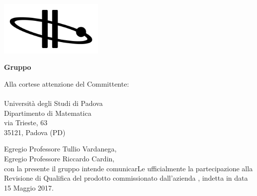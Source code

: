   
\begin{titlepage}
	
	\begin{center}
	 	
	\includegraphics[width=5cm]{../../modello/or-bit_bkg_minBorder.png} 
	\begin{Huge} 
	 	\textbf{Gruppo \GroupName{}}
	\end{Huge}
	\end{center}
	
	\vspace{1cm}
	\begin{large}
	\begin{flushright}
		Alla cortese attenzione del Committente: \\
		\Committente \\
		Università degli Studi di Padova \\
		Dipartimento di Matematica \\
		via Trieste, 63 \\
		35121, Padova (PD) 
		
		\vspace{0,3cm}
		
	
	\end{flushright}

	\vspace{1cm}
	
	Egregio Professore Tullio Vardanega,\\
	Egregio Professore Riccardo Cardin, \\
	
	con la presente il gruppo \GroupName{} intende comunicarLe ufficialmente la partecipazione alla Revisione di Qualifica del prodotto \ProjectName{} commissionato dall'azienda \Proponente{}, indetta in data 15 Maggio 2017.\\	
	

\end{large}
\end{titlepage}
